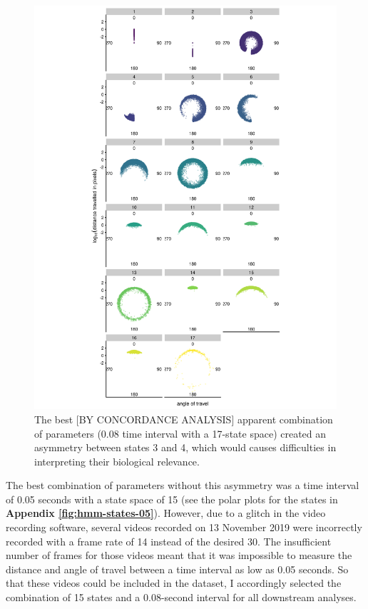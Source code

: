 \documentclass[
]{book}
\begin{document}
\begin{figure}
\includegraphics[width=1\linewidth]{figs/mikk_behaviour/0.08_17_polar_all_dge} \caption{The best {[}BY CONCORDANCE ANALYSIS{]} apparent combination of parameters (0.08 time interval with a 17-state space) created an asymmetry between states 3 and 4, which would causes difficulties in interpreting their biological relevance.}\label{fig:mikk-hmm-asym}
\end{figure}

The best combination of parameters without this asymmetry was a time interval of 0.05 seconds with a state space of 15 (see the polar plots for the states in \textbf{Appendix \ref{fig:hmm-states-05}}). However, due to a glitch in the video recording software, several videos recorded on 13 November 2019 were incorrectly recorded with a frame rate of 14 instead of the desired 30. The insufficient number of frames for those videos meant that it was impossible to measure the distance and angle of travel between a time interval as low as 0.05 seconds. So that these videos could be included in the dataset, I accordingly selected the combination of 15 states and a 0.08-second interval for all downstream analyses.
\end{document}
